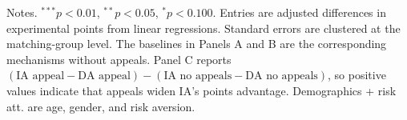 \begin{table}[htbp]
\begin{threeparttable}
\begin{tablenotes}[flushleft]
\footnotesize
\item Notes. \(^{***}p<0.01\), \(^{**}p<0.05\), \(^{*}p<0.100\). Entries are adjusted differences in experimental points from linear regressions. Standard errors are clustered at the matching-group level. The baselines in Panels A and B are the corresponding mechanisms without appeals. Panel C reports \((\text{IA appeal}-\text{DA appeal})-(\text{IA no appeals}-\text{DA no appeals})\), so positive values indicate that appeals widen IA's points advantage. Demographics + risk att. are age, gender, and risk aversion.
\end{tablenotes}
\end{threeparttable}
\end{table}
